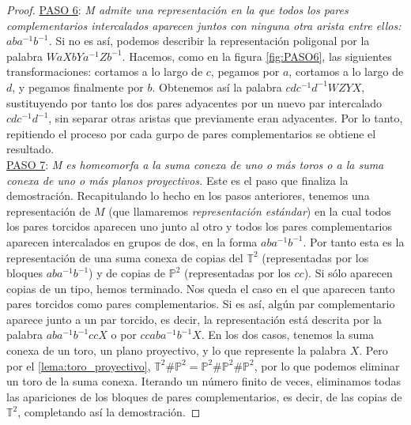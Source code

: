 \documentclass[10pt]{report}
\newcommand{\Toro}{\mathbb{T}^2}
\newcommand{\Proyectivo}{\mathbb{P}^2}
\theoremstyle{definition}
\begin{document}
\begin{proof}
\underline{PASO 6}: \textit{M admite una representación en la que todos los pares complementarios intercalados aparecen juntos con ninguna otra arista entre ellos: $aba^{-1}b^{-1}$.} Si no es así, podemos describir la representación poligonal por la palabra $WaXbYa^{-1}Zb^{-1}$. Hacemos, como en la figura \autoref{fig:PASO6}, las siguientes transformaciones: cortamos a lo largo de $c$, pegamos por $a$, cortamos a lo largo de $d$, y pegamos finalmente por $b$. Obtenemos así la palabra $cdc^{-1}d^{-1}WZYX$, sustituyendo por tanto los dos pares adyacentes por un nuevo par intercalado $cdc^{-1}d^{-1}$, sin separar otras aristas que previamente eran adyacentes. Por lo tanto, repitiendo el proceso por cada gurpo de pares complementarios se obtiene el resultado.\\

\underline{PASO 7}: \textit{M es homeomorfa a la suma conexa de uno o más toros o a la suma conexa de uno o más planos proyectivos.} Este es el paso que finaliza la demostración.  Recapitulando lo hecho en los pasos anteriores, tenemos una representación de $M$ (que llamaremos \textit{representación estándar}) en la cual todos los pares torcidos aparecen uno junto al otro y todos los pares complementarios aparecen intercalados en grupos de dos, en la forma $aba^{-1}b^{-1}$. Por tanto esta es la representación de una suma conexa de copias del $\Toro$ (representadas por los bloques $aba^{-1}b^{-1}$) y de copias de $\Proyectivo$ (representadas por los $cc$). Si sólo aparecen copias de un tipo, hemos terminado.
Nos queda el caso en el que aparecen tanto pares torcidos como pares complementarios. Si es así, algún par complementario aparece junto a un par torcido, es decir, la representación está descrita por la palabra $aba^{-1}b^{-1}ccX$ o por $ccaba^{-1}b^{-1}X$. En los dos casos, tenemos la suma conexa de un toro, un plano proyectivo, y lo que represente la palabra $X$. Pero por el \autoref{lema:toro_proyectivo}, $\Toro \# \Proyectivo = \Proyectivo \# \Proyectivo \# \Proyectivo$, por lo que podemos eliminar un toro de la suma conexa. Iterando un número finito de veces, eliminamos todas las apariciones de los bloques de pares complementarios, es decir, de las copias de $\Toro$, completando así la demostración.
\end{proof}
\end{document}
